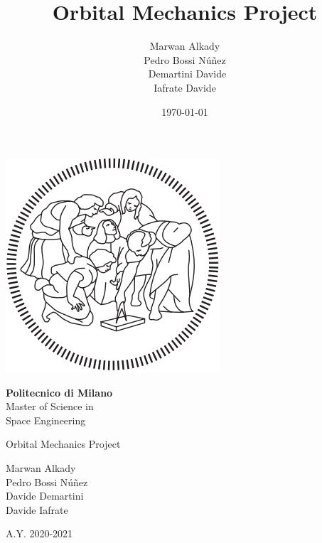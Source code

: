 \documentclass[11pt,a4paper]{report}
\title{Orbital Mechanics Project}
\author{Marwan Alkady\\ Pedro Bossi N\'{u}\~{n}ez \\\ Demartini Davide\\ Iafrate Davide\\}
\date{\today}
\begin{document}
\begin{titlepage}
	\clearpage\thispagestyle{empty}
	\centering

    
   \centering \includegraphics[scale=0.7]{logo}
    
   \vspace{0.5cm}
	
	{\Huge\textbf{Politecnico di Milano} \\ 
Master of Science in\\ Space Engineering \\
		 \par}
		\vspace{3cm}
	{\Huge{Orbital Mechanics Project}} \\
	\vspace{4cm}
	{\LARGE Marwan Alkady\\ Pedro Bossi N\'{u}\~{n}ez \\ Davide Demartini\\ Davide Iafrate\\ \par}

\vspace{1cm}
	{\Large A.Y. 2020-2021 \par}
	
	\pagebreak

\end{titlepage}
\maketitle
%
\tableofcontents 
%
\end{document}
